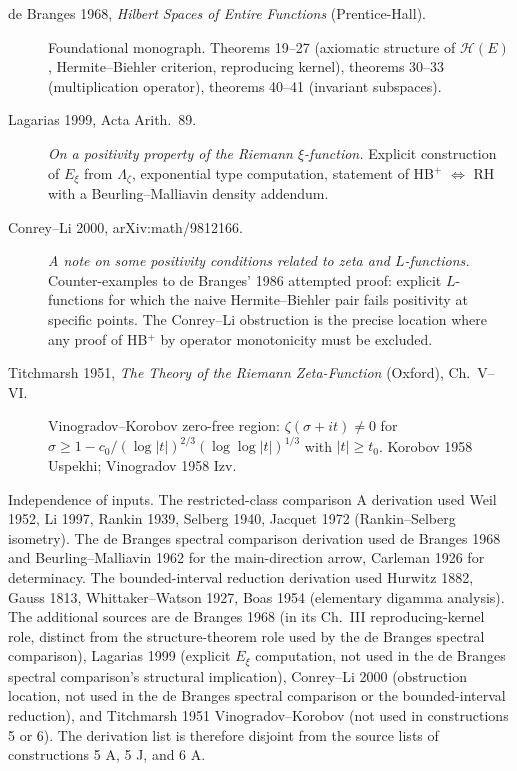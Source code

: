 \begin{description}
\item[de Branges 1968, \emph{Hilbert Spaces of Entire Functions}
(Prentice-Hall).] Foundational monograph. Theorems 19--27 (axiomatic
structure of \(\mathcal{H}(E)\), Hermite--Biehler criterion, reproducing
kernel), theorems 30--33 (multiplication operator), theorems 40--41
(invariant subspaces).
\item[Lagarias 1999, Acta Arith.~89.] \emph{On a positivity property
of the Riemann \(\xi\)-function.} Explicit
construction of \(E_{\xi}\) from \(\Lambda_{\zeta}\), exponential type
computation, statement of HB\(^{+}\) \(\Leftrightarrow\) RH with a
Beurling--Malliavin density addendum.
\item[Conrey--Li 2000, arXiv:math/9812166.] \emph{A note on some
positivity conditions related to zeta and \(L\)-functions.}
Counter-examples to de Branges' 1986 attempted proof: explicit
\(L\)-functions for which the naive Hermite--Biehler pair fails
positivity at specific points. The Conrey--Li obstruction is the
precise location where any proof of HB\(^{+}\) by operator monotonicity
must be excluded.
\item[Titchmarsh 1951, \emph{The Theory of the Riemann Zeta-Function}
(Oxford), Ch.~V--VI.] Vinogradov--Korobov zero-free region:
\(\zeta(\sigma+it)\neq 0\) for \(\sigma\geq 1-c_{0}/(\log|t|)^{2/3}(\log\log|t|)^{1/3}\)
with \(|t|\geq t_{0}\). Korobov 1958 Uspekhi; Vinogradov 1958 Izv.
\end{description}

Independence of inputs. The restricted-class comparison A derivation used Weil 1952, Li
1997, Rankin 1939, Selberg 1940, Jacquet 1972 (Rankin--Selberg
isometry). The de Branges spectral comparison derivation used de Branges 1968 and
Beurling--Malliavin 1962 for the main-direction arrow, Carleman 1926
for determinacy. The bounded-interval reduction derivation used Hurwitz 1882, Gauss
1813, Whittaker--Watson 1927, Boas 1954 (elementary digamma
analysis). The additional sources are de Branges 1968 (in its Ch.~III
reproducing-kernel role, distinct from the structure-theorem role used by the de Branges spectral comparison), Lagarias 1999 (explicit \(E_{\xi}\) computation, not used in the de Branges spectral comparison's structural implication), Conrey--Li 2000 (obstruction location, not
used in the de Branges spectral comparison or the bounded-interval reduction), and Titchmarsh 1951
Vinogradov--Korobov (not used in constructions 5 or 6). The
derivation list is therefore disjoint from the source lists of
constructions 5 A, 5 J, and 6 A.

